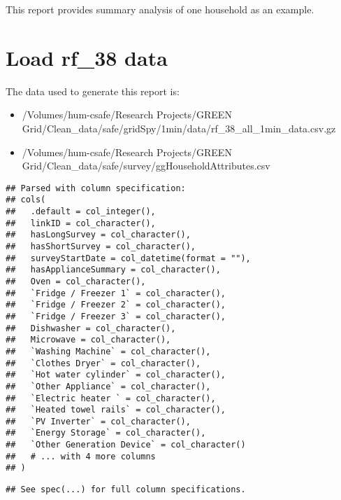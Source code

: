 \documentclass[]{article}
\providecommand{\tightlist}{%
  \setlength{\itemsep}{0pt}\setlength{\parskip}{0pt}}
\theoremstyle{definition}
\theoremstyle{definition}
\theoremstyle{definition}
\theoremstyle{remark}
\begin{document}
This report provides summary analysis of one household as an example.

\section{Load rf\_38 data}\label{load-rf_38-data}

The data used to generate this report is:

\begin{itemize}
\tightlist
\item
  /Volumes/hum-csafe/Research Projects/GREEN
  Grid/Clean\_data/safe/gridSpy/1min/data/rf\_38\_all\_1min\_data.csv.gz
\item
  /Volumes/hum-csafe/Research Projects/GREEN
  Grid/Clean\_data/safe/survey/ggHouseholdAttributes.csv
\end{itemize}

\begin{verbatim}
## Parsed with column specification:
## cols(
##   .default = col_integer(),
##   linkID = col_character(),
##   hasLongSurvey = col_character(),
##   hasShortSurvey = col_character(),
##   surveyStartDate = col_datetime(format = ""),
##   hasApplianceSummary = col_character(),
##   Oven = col_character(),
##   `Fridge / Freezer 1` = col_character(),
##   `Fridge / Freezer 2` = col_character(),
##   `Fridge / Freezer 3` = col_character(),
##   Dishwasher = col_character(),
##   Microwave = col_character(),
##   `Washing Machine` = col_character(),
##   `Clothes Dryer` = col_character(),
##   `Hot water cylinder` = col_character(),
##   `Other Appliance` = col_character(),
##   `Electric heater ` = col_character(),
##   `Heated towel rails` = col_character(),
##   `PV Inverter` = col_character(),
##   `Energy Storage` = col_character(),
##   `Other Generation Device` = col_character()
##   # ... with 4 more columns
## )
\end{verbatim}

\begin{verbatim}
## See spec(...) for full column specifications.
\end{verbatim}
\end{document}
